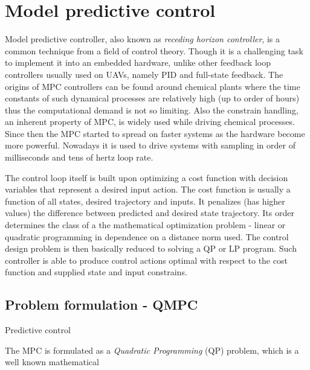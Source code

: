 \section{Model predictive control}

Model predictive controller, also known as \textit{receding horizon controller}, is a common technique from a field of control theory. Though it is a challenging task to implement it into an embedded hardware, unlike other feedback loop controllers usually used on UAVs, namely PID and full-state feedback. The origins of MPC controllers can be found around chemical plants where the time constants of such dynamical processes are relatively high (up to order of hours) thus the computational demand is not so limiting. Also the constrain handling, an inherent property of MPC, is widely used while driving chemical processes. Since then the MPC started to spread on faster systems as the hardware become more powerful. Nowadays it is used to drive systems with sampling in order of milliseconds and tens of hertz loop rate.

The control loop itself is built upon optimizing a cost function with decision variables that represent a desired input action. The cost function is usually a function of all states, desired trajectory and inputs. It penalizes (has higher values) the difference between predicted and desired state trajectory. Its order determines the class of a the mathematical optimization problem - linear or quadratic programming in dependence on a distance norm used. The control design problem is then basically reduced to solving a QP or LP program. Such controller is able to produce control actions optimal with respect to the cost function and supplied state and input constrains.

\subsection{Problem formulation - QMPC}

Predictive control 

The MPC is formulated as a \textit{Quadratic Programming} (QP) problem, which is a well known mathematical 